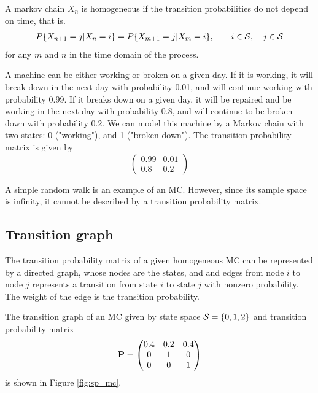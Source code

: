 \begin{definition}
A markov chain $X_n$ is homogeneous if the transition probabilities do not depend on time, that is.
\begin{align}
P\{X_{n+1}=j| X_n=i\} = P\{X_{m+1}=j| X_m=i\},   \qquad i \in {\cal S},\quad  j \in {\cal S} 
\end{align}
for any $m$ and $n$ in the time domain of the process.
\end{definition}


\begin{example}
A machine can be either working or broken on a given day. If it is working, it will break down in the next day with probability 0.01, and will continue working with probability 0.99. If it breaks down
on a given day, it will be repaired and be working in the next day with probability 0.8, and will continue to be broken down with probability 0.2. We can model this machine by a Markov chain with two states: 0 ("working"), and 1 ("broken down"). The transition probability matrix is given by
$$
\begin{pmatrix}
0.99 & 0.01 \\
0.8 & 0.2
\end{pmatrix}
$$
\end{example}

\begin{example}[SRW]
A simple random walk is an example of an MC. However, since its sample space is infinity, it cannot be described by a transition probability matrix.
\end{example}

\subsection{Transition graph}

The transition probability matrix of a given homogeneous MC can be  represented by a directed graph, whose nodes are the states, and and edges from node $i$ to node $j$ represents a transition from state $i$ to state $j$ with nonzero probability. The weight of the edge is the transition probability.

\begin{example}\label{sp:MC3ex}
The transition graph of an MC given by state space ${\cal S} = \{0, 1, 2\}$ and transition probability matrix
\begin{align}
\label{sp:MC3example}
{\bf P} = \begin{pmatrix}
0.4 & 0.2 & 0.4 \\
0   & 1   & 0 \\
0   & 0   & 1 
\end{pmatrix}
\end{align}
is shown in Figure \ref{fig:sp_mc}.
\end{example}


